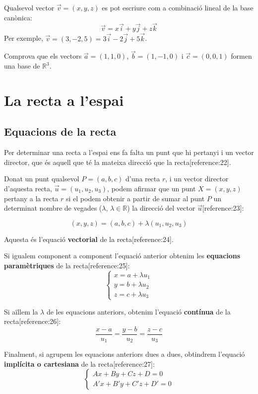 \documentclass[12pt]{article}
\begin{document}
\begin{exemple}
Qualsevol vector $\vec{v} = (x, y, z)$ es pot escriure com a combinació lineal de la base canònica:
\[
\vec{v} = x\vec{i} + y\vec{j} + z\vec{k}
\]
Per exemple, $\vec{v} = (3, -2, 5) = 3\vec{i} - 2\vec{j} + 5\vec{k}$.
\end{exemple}

\begin{exercici}
Comprova que els vectors $\vec{a} = (1, 1, 0)$, $\vec{b} = (1, -1, 0)$ i $\vec{c} = (0, 0, 1)$ formen una base de $\mathbb{R}^3$.
\end{exercici}

\section{La recta a l'espai}

\subsection{Equacions de la recta}

\begin{concept}
Per determinar una recta a l'espai ens fa falta un punt que hi pertanyi i un vector director, que és aquell que té la mateixa direcció que la recta[reference:22].

Donat un punt qualsevol $P=(a,b,c)$ d'una recta $r$, i un vector director d'aquesta recta, $\vec{u}=(u_1,u_2,u_3)$, podem afirmar que un punt $X=(x,y,z)$ pertany a la recta $r$ si el podem obtenir a partir de sumar al punt $P$ un determinat nombre de vegades ($\lambda$, $\lambda\in\mathbb{R}$) la direcció del vector $\vec{u}$[reference:23]:

\[
\boxed{(x,y,z)=(a,b,c)+\lambda(u_1,u_2,u_3)}
\]

Aquesta és l'equació \textbf{vectorial} de la recta[reference:24].

Si igualem component a component l'equació anterior obtenim les \textbf{equacions paramètriques} de la recta[reference:25]:
\[
\boxed{
\begin{cases}
x = a + \lambda u_1 \\
y = b + \lambda u_2 \\
z = c + \lambda u_3
\end{cases}
}
\]

Si aïllem la $\lambda$ de les equacions anteriors, obtenim l'equació \textbf{contínua} de la recta[reference:26]:
\[
\boxed{\frac{x-a}{u_1} = \frac{y-b}{u_2} = \frac{z-c}{u_3}}
\]

Finalment, si agrupem les equacions anteriors dues a dues, obtindrem l'equació \textbf{implícita o cartesiana} de la recta[reference:27]:
\[
\boxed{
\begin{cases}
Ax + By + Cz + D = 0 \\
A'x + B'y + C'z + D' = 0
\end{cases}
}
\]
\end{concept}
\end{document}
